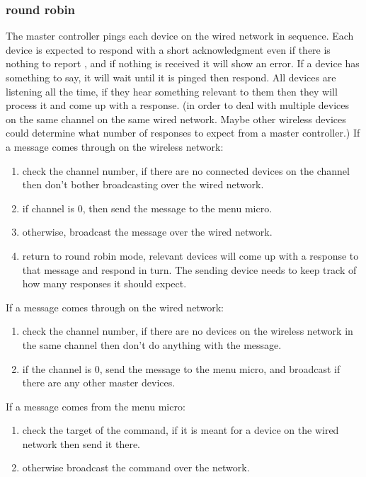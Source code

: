 \documentclass{article}
\begin{document}
     \subsubsection{round robin}
     The master controller pings each device on the wired network in sequence.
     Each device is expected to respond with a short acknowledgment even if there is nothing to report
     , and if nothing is received it will show an error.
     If a device has something to say, it will wait until it is pinged then respond.
     All devices are listening all the time, if they hear something relevant to them then they will process it and come up with a response.
     (in order to deal with multiple devices on the same channel on the same wired network. Maybe other wireless devices could determine what number of responses to expect from a master controller.)
     If a message comes through on the wireless network:
     \begin{enumerate}
     	\item check the channel number, if there are no connected devices on the channel then don't bother broadcasting over the wired network.
     	\item if channel is 0, then send the message to the menu micro.
     	\item otherwise, broadcast the message over the wired network.
     	\item return to round robin mode, relevant devices will come up with a response to that message and respond in turn.
     	The sending device needs to keep track of how many responses it should expect.
     \end{enumerate}
     If a message comes through on the wired network:
     \begin{enumerate}
     	\item check the channel number, if there are no devices on the wireless network in the same channel then don't do anything with the message.
     	\item if the channel is 0, send the message to the menu micro, and broadcast if there are any other master devices.
     \end{enumerate}
     If a message comes from the menu micro:
     \begin{enumerate}
     	\item check the target of the command, if it is meant for a device on the wired network then send it there.
     	\item otherwise broadcast the command over the network.
     \end{enumerate}
\end{document}
